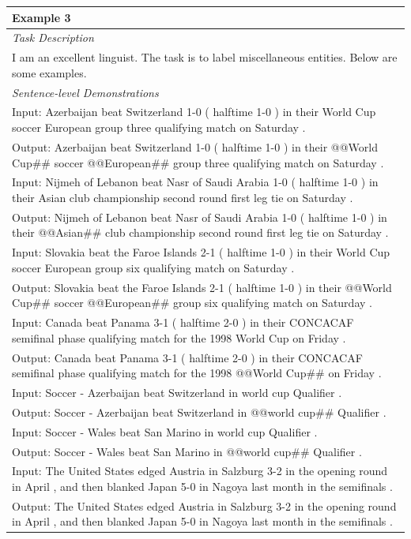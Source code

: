 \documentclass[11pt]{article}
\begin{document}
\begin{table}[th!]
{\begin{tabular}{l}
\textbf{Example 3} \\\midrule
       	\textit{Task Description} \\
I am an excellent linguist. The task is to label miscellaneous entities. Below are some examples. \\\midrule
\textit{Sentence-level Demonstrations} \\
Input: Azerbaijan beat Switzerland 1-0 ( halftime 1-0 ) in their World Cup soccer European group three qualifying match on Saturday . \\
Output: Azerbaijan beat Switzerland 1-0 ( halftime 1-0 ) in their @@World Cup\#\# soccer @@European\#\# group three qualifying match on Saturday . \\
Input: Nijmeh of Lebanon beat Nasr of Saudi Arabia 1-0 ( halftime 1-0 ) in their Asian club championship second round first leg tie on Saturday . \\
Output: Nijmeh of Lebanon beat Nasr of Saudi Arabia 1-0 ( halftime 1-0 ) in their @@Asian\#\# club championship second round first leg tie on Saturday . \\
Input: Slovakia beat the Faroe Islands 2-1 ( halftime 1-0 ) in their World Cup soccer European group six qualifying match on Saturday . \\
Output: Slovakia beat the Faroe Islands 2-1 ( halftime 1-0 ) in their @@World Cup\#\# soccer @@European\#\# group six qualifying match on Saturday . \\
Input: Canada beat Panama 3-1 ( halftime 2-0 ) in their CONCACAF semifinal phase qualifying match for the 1998 World Cup on Friday . \\
Output: Canada beat Panama 3-1 ( halftime 2-0 ) in their CONCACAF semifinal phase qualifying match for the 1998 @@World Cup\#\# on Friday . \\
Input: Soccer - Azerbaijan beat Switzerland in world cup Qualifier . \\
Output: Soccer - Azerbaijan beat Switzerland in @@world cup\#\# Qualifier . \\
Input: Soccer - Wales beat San Marino in world cup Qualifier . \\
Output: Soccer - Wales beat San Marino in @@world cup\#\# Qualifier . \\
Input: The United States edged Austria in Salzburg 3-2 in the opening round in April , and then blanked Japan 5-0 in Nagoya last month in the semifinals . \\
Output: The United States edged Austria in Salzburg 3-2 in the opening round in April , and then blanked Japan 5-0 in Nagoya last month in the semifinals . \\

\end{tabular}}
\end{table}
\end{document}
